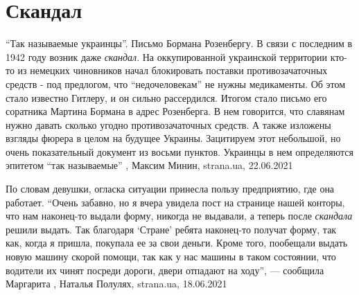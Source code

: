  
 
 
 
 
\chapter{Скандал}

\enquote{Так называемые украинцы}. Письмо Бормана Розенбергу.  В связи с последним в
1942 году возник даже \emph{скандал}. На оккупированной украинской территории кто-то
из немецких чиновников начал блокировать поставки противозачаточных средств -
под предлогом, что \enquote{недочеловекам} не нужны медикаменты.  Об этом стало
известно Гитлеру, и он сильно рассердился. Итогом стало письмо его соратника
Мартина Бормана в адрес Розенберга. В нем говорится, что славянам нужно давать
сколько угодно противозачаточных средств. А также изложены взгляды фюрера в
целом на будущее Украины.  Зацитируем этот небольшой, но очень показательный
документ из восьми пунктов. Украинцы в нем определяются эпитетом \enquote{так
называемые}
  , Максим Минин, strana.ua, 22.06.2021

По словам девушки, огласка ситуации принесла пользу предприятию, где она
работает.  \enquote{Очень забавно, но я вчера увидела пост на странице нашей конторы,
что нам наконец-то выдали форму, никогда не выдавали, а теперь после \emph{скандала}
решили выдать. Так благодаря \enquote{Стране} ребята наконец-то получат форму, так как,
когда я пришла, покупала ее за свои деньги. Кроме того, пообещали выдать новую
машину скорой помощи, так как у нас машины в таком состоянии, что водители их
чинят посреди дороги, двери отпадают на ходу}, — сообщила Маргарита
, 
Наталья Полулях, strana.ua, 18.06.2021

